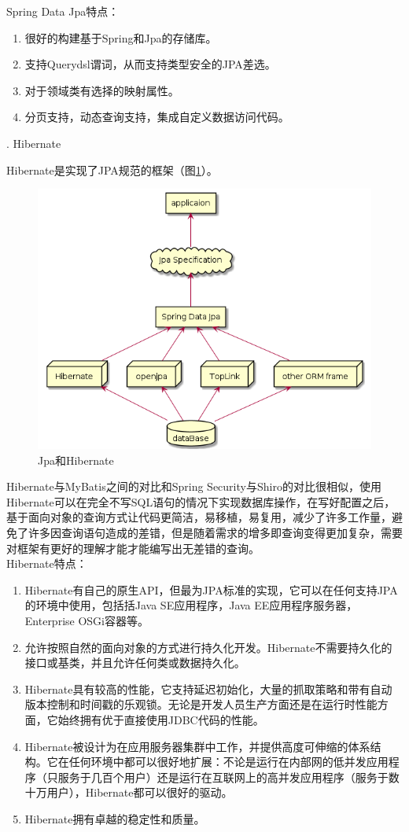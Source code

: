 Spring Data Jpa特点：
\begin{enumerate}
  \item 很好的构建基于Spring和Jpa的存储库。
  \item 支持Querydsl谓词，从而支持类型安全的JPA差选。
  \item 对于领域类有选择的映射属性。
  \item 分页支持，动态查询支持，集成自定义数据访问代码。
\end{enumerate}

. Hibernate

Hibernate是实现了JPA规范的框架（图\ref{JpaAndHibernate}）。
\begin{figure}[htbp]
  \centering
  \includegraphics[scale = 0.5]{out/uml/部署图/Jpa和Hibernate/Jpa和Hibernate.png}
  \caption{\song\wuhao Jpa和Hibernate}
  \label{JpaAndHibernate}
\end{figure} Hibernate与MyBatis之间的对比和Spring Security与Shiro的对比很相似，使用Hibernate可以在完全不写SQL语句的情况下实现数据库操作，在写好配置之后，基于面向对象的查询方式让代码更简洁，易移植，易复用，减少了许多工作量，避免了许多因查询语句造成的差错，但是随着需求的增多即查询变得更加复杂，需要对框架有更好的理解才能才能编写出无差错的查询。\\
Hibernate特点：
\begin{enumerate}
  \item Hibernate有自己的原生API，但最为JPA标准的实现，它可以在任何支持JPA的环境中使用，包括括Java SE应用程序，Java EE应用程序服务器，Enterprise OSGi容器等。
  \item 允许按照自然的面向对象的方式进行持久化开发。Hibernate不需要持久化的接口或基类，并且允许任何类或数据持久化。
  \item Hibernate具有较高的性能，它支持延迟初始化，大量的抓取策略和带有自动版本控制和时间戳的乐观锁。无论是开发人员生产方面还是在运行时性能方面，它始终拥有优于直接使用JDBC代码的性能。
  \item Hibernate被设计为在应用服务器集群中工作，并提供高度可伸缩的体系结构。它在任何环境中都可以很好地扩展：不论是运行在内部网的低并发应用程序（只服务于几百个用户）还是运行在互联网上的高并发应用程序（服务于数十万用户），Hibernate都可以很好的驱动。
  \item Hibernate拥有卓越的稳定性和质量。
\end{enumerate}

